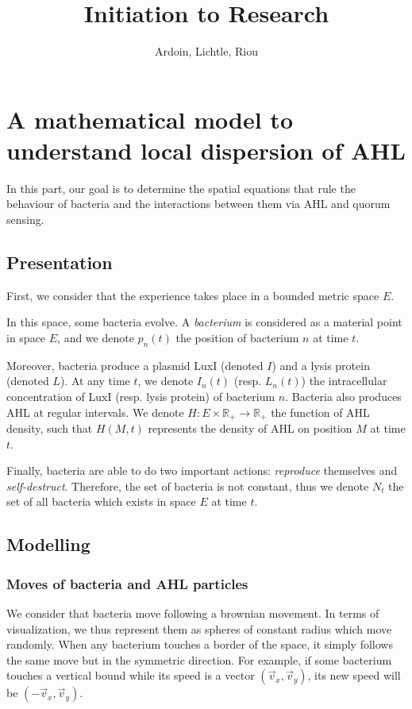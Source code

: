 \documentclass[a4paper]{article}
\title{Initiation to Research}
\author{Ardoin, Lichtle, Riou}
\theoremstyle{definition}
\begin{document}
\maketitle

\section{A mathematical model to understand local dispersion of AHL}

In this part, our goal is to determine the spatial equations that rule the behaviour of bacteria and the interactions between them via AHL and quorum sensing.

\subsection{Presentation}

First, we consider that the experience takes place in a bounded metric space $E$.

In this space, some bacteria evolve. A \emph{bacterium} is considered as a material point in space $E$, and we denote $p_n(t)$ the position of bacterium $n$ at time $t$.

Moreover, bacteria produce a plasmid LuxI (denoted $I$) and a lysis protein (denoted $L$). At any time $t$, we denote $I_n(t)$ (resp. $L_n(t)$) the intracellular concentration of LuxI (resp. lysis protein) of bacterium $n$. Bacteria also produces AHL at regular intervals. We denote $H : E \times \mathbb{R}_+ \to \mathbb{R}_+$ the function of AHL density, such that $H(M,t)$ represents the density of AHL on position $M$ at time $t$.

Finally, bacteria are able to do two important actions: \emph{reproduce} themselves and \emph{self-destruct}. Therefore, the set of bacteria is not constant, thus we denote $N_t$ the set of all bacteria which exists in space $E$ at time $t$.

\subsection{Modelling}

\subsubsection{Moves of bacteria and AHL particles}

We consider that bacteria move following a brownian movement. In terms of visualization, we thus represent them as spheres of constant radius which move randomly. When any bacterium touches a border of the space, it simply follows the same move but in the symmetric direction. For example, if some bacterium touches a vertical bound while its speed is a vector $(\vec{v}_x, \vec{v}_y)$, its new speed will be $(-\vec{v}_x, \vec{v}_y)$.
\end{document}
